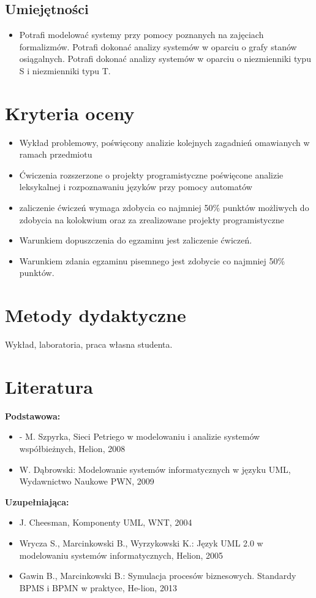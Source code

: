 \documentclass[12pt, a4paper]{article}
\begin{document}
\subsection*{Umiejętności}
\begin{itemize}
  \item Potrafi modelować systemy przy pomocy poznanych na zajęciach formalizmów. Potrafi dokonać analizy systemów w oparciu o grafy stanów osiągalnych. Potrafi dokonać analizy systemów w oparciu o niezmienniki typu S i niezmienniki typu T.
\end{itemize}

\section{Kryteria oceny}

\begin{itemize}
  \item Wykład problemowy, poświęcony analizie kolejnych zagadnień omawianych w ramach przedmiotu
  \item Ćwiczenia rozszerzone o projekty programistyczne poświęcone analizie leksykalnej i rozpoznawaniu języków przy pomocy automatów
  \item zaliczenie ćwiczeń  wymaga zdobycia co najmniej  50\% punktów możliwych do zdobycia na kolokwium oraz za zrealizowane projekty programistyczne
  \item Warunkiem dopuszczenia do egzaminu jest zaliczenie ćwiczeń.
  \item Warunkiem zdania egzaminu pisemnego jest zdobycie co najmniej  50\% punktów.
\end{itemize}

\section{Metody dydaktyczne}

Wykład, laboratoria, praca własna studenta.

\section{Literatura}

\textbf{Podstawowa:}
\begin{itemize}
  \item - M. Szpyrka, Sieci Petriego w modelowaniu i analizie systemów współbieżnych, Helion, 2008
  \item W. Dąbrowski: Modelowanie systemów informatycznych w języku UML, Wydawnictwo Naukowe PWN, 2009
\end{itemize}

\textbf{Uzupełniająca:}
\begin{itemize}
  \item J. Cheesman, Komponenty UML, WNT, 2004
  \item Wrycza S., Marcinkowski B., Wyrzykowski K.: Język UML 2.0 w modelowaniu systemów informatycznych, Helion, 2005
  \item Gawin B., Marcinkowski B.: Symulacja procesów biznesowych. Standardy BPMS i BPMN w praktyce, He-lion, 2013
\end{itemize}
\end{document}
